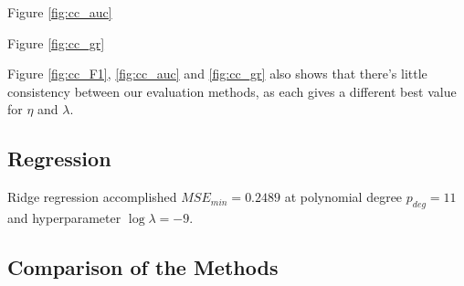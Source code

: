    
        Figure \ref{fig:cc_auc}
        
        Figure \ref{fig:cc_gr}
        
        Figure \ref{fig:cc_F1}, \ref{fig:cc_auc} and \ref{fig:cc_gr} also shows that there's little  consistency between our evaluation methods, as each gives a different best value for $\eta$ and $\lambda$.
        
            
            
    \subsection{Regression}
        Ridge regression accomplished $MSE_{min}=0.2489$ at polynomial degree $p_{deg}=11$ and hyperparameter $\log\lambda=-9$.
             
            
     
    \subsection{Comparison of the Methods}
        
        
        
        
        
